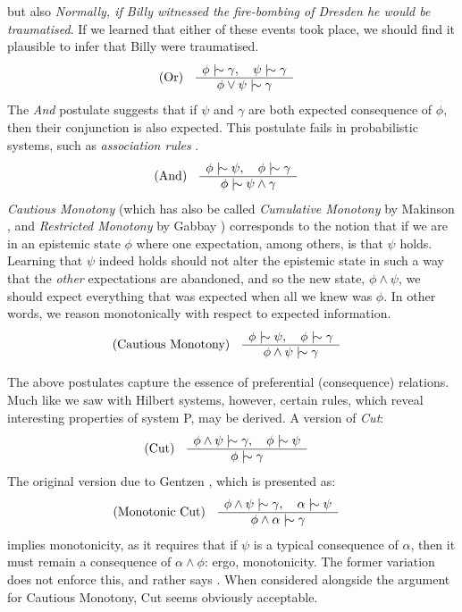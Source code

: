 but also \textit{Normally, if Billy witnessed the fire-bombing of Dresden he would be traumatised}. If we learned that
either of these events took place, we should find it plausible to infer that Billy were traumatised.
%
\begin{align}
	\inferLeft{Or}{\phi \twiddle \gamma, \quad \psi \twiddle \gamma}{\phi \lor \psi \twiddle \gamma}
\end{align}
%
The \textit{And} postulate suggests that if $\psi$ and $\gamma$ are both expected consequence of $\phi$, then their
conjunction is also expected. This postulate fails in probabilistic systems, such as \textit{association rules} \cite{gabbay1985theoreticalFoundations}.
%
\begin{align}
	\label{postulate:and}\inferLeft{And}{\phi \twiddle \psi, \quad \phi \twiddle \gamma}{\phi \twiddle \psi \land \gamma}
\end{align}
%
\textit{Cautious Monotony} (which has also be called \textit{Cumulative Monotony} by Makinson \cite{makinson2003bridges},
and \textit{Restricted Monotony} by Gabbay \cite{gabbay1985theoreticalFoundations}) corresponds to the notion that if we
are in an epistemic state $\phi$ where one expectation, among others, is that $\psi$ holds. Learning that $\psi$ indeed holds
should not alter the epistemic state in such a way that the \textit{other} expectations are abandoned, and so the new state,
$\phi \land \psi$, we should expect everything that was expected when all we knew was $\phi$. In other words, we reason monotonically
with respect to expected information.
%
\begin{align}
	\label{postulate:cm}\inferLeft{Cautious Monotony}{\phi \twiddle \psi, \quad \phi \twiddle \gamma }{\phi \land \psi \twiddle \gamma}
\end{align}

The above postulates capture the essence of preferential (consequence) relations. Much like we saw with Hilbert systems,
however, certain rules, which reveal interesting properties of system P, may be derived. A version of \textit{Cut}:
%
\begin{align}
	\label{postulate:cut}\inferLeft{Cut}{\phi \land \psi \twiddle \gamma, \quad \phi \twiddle \psi}{\phi \twiddle \gamma}
\end{align}
%
The original version due to Gentzen \cite{Ben1993Mathematical}, which is presented as:
%
\begin{align}
	\inferLeft{Monotonic Cut}{\phi \land \psi \twiddle \gamma, \quad \alpha \twiddle \psi}{\phi \land \alpha \twiddle \gamma}
\end{align}
%
implies monotonicity, as it requires that if $\psi$ is a typical consequence of $\alpha$, then it must remain a consequence
of $\alpha \land \phi$: ergo, monotonicity. The former variation does not enforce this, and rather says .
When considered alongside the argument for Cautious Monotony, Cut seems obviously acceptable.

